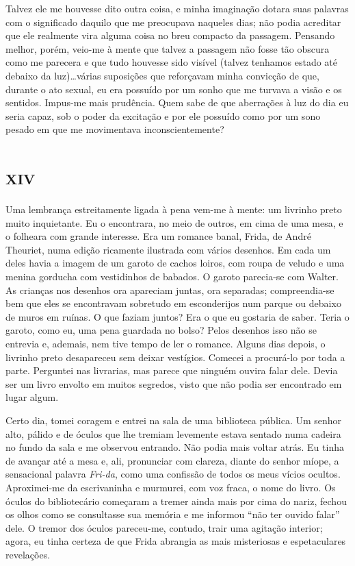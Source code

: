 Talvez ele me houvesse dito outra coisa, e minha imaginação dotara suas palavras com o significado daquilo que me preocupava naqueles dias; não podia acreditar que ele realmente vira alguma coisa no breu compacto da passagem. Pensando melhor, porém, veio-me à mente que talvez a passagem não fosse tão obscura como me parecera e que tudo houvesse sido visível (talvez tenhamos estado até debaixo da luz)\dots várias suposições que reforçavam minha convicção de que, durante o ato sexual, eu era possuído por um sonho que me turvava a visão e os sentidos. Impus-me mais prudência. Quem sabe de que aberrações à luz do dia eu seria capaz, sob o poder da excitação e por ele possuído como por um sono pesado em que me movimentava inconscientemente?


\chapter*{\huge\centering\textsc{xiv}}

Uma lembrança estreitamente ligada à pena vem-me à mente: um livrinho preto muito inquietante. Eu o encontrara, no meio de outros, em cima de uma mesa, e o folheara com grande interesse. Era um romance banal, Frida, de André Theuriet, numa edição ricamente ilustrada com vários desenhos. Em cada um deles havia a imagem de um garoto de cachos loiros, com roupa de veludo e uma menina gorducha com vestidinhos de babados. O garoto parecia-se com Walter. As crianças nos desenhos ora apareciam juntas, ora separadas; compreendia-se bem que eles se encontravam sobretudo em esconderijos num parque ou debaixo de muros em ruínas. O que faziam juntos? Era o que eu gostaria de saber. Teria o garoto, como eu, uma pena guardada no bolso? Pelos desenhos isso não se entrevia e, ademais, nem tive tempo de ler o romance. Alguns dias depois, o livrinho preto desapareceu sem deixar vestígios. Comecei a procurá-lo por toda a parte. Perguntei nas livrarias, mas parece que ninguém ouvira falar dele. Devia ser um livro envolto em muitos segredos, visto que não podia ser encontrado em lugar algum.

Certo dia, tomei coragem e entrei na sala de uma biblioteca pública. Um senhor alto, pálido e de óculos que lhe tremiam levemente estava sentado numa cadeira no fundo da sala e me observou entrando. Não podia mais voltar atrás. Eu tinha de avançar até a mesa e, ali, pronunciar com clareza, diante do senhor míope, a sensacional palavra \textit{Fri-da}, como uma confissão de todos os meus vícios ocultos. Aproximei-me da escrivaninha e murmurei, com voz fraca, o nome do livro. Os óculos do bibliotecário começaram a tremer ainda mais por cima do nariz, fechou os olhos como se consultasse sua memória e me informou ``não ter ouvido falar'' dele. O tremor dos óculos pareceu-me, contudo, trair uma agitação interior; agora, eu tinha certeza de que Frida abrangia as mais misteriosas e espetaculares revelações.

